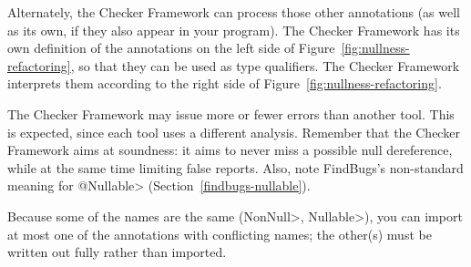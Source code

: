 

Alternately, the Checker Framework can process those other annotations (as
well as its own, if they also appear in your program).  The Checker
Framework has its own definition of the annotations on the left side of
Figure~\ref{fig:nullness-refactoring}, so that they can be used as type
qualifiers.  The Checker Framework interprets them according to the right
side of Figure~\ref{fig:nullness-refactoring}.

The Checker Framework may issue more or fewer errors than another tool.
This is expected, since each tool uses a different analysis.  Remember that
the Checker Framework aims at soundness:  it aims to never miss a possible
null dereference, while at the same time limiting false reports.  Also,
note FindBugs's non-standard meaning for \<@Nullable>
(Section~\ref{findbugs-nullable}).

Because some of the names are the same (\<NonNull>, \<Nullable>), you can
import at most one of the annotations with
conflicting names; the other(s) must be written out fully rather than
imported.

